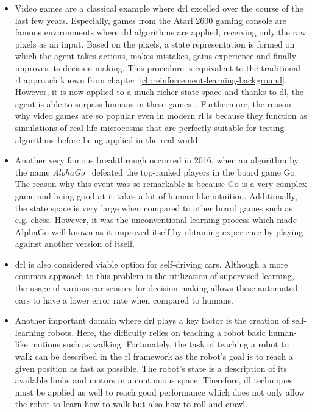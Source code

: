 \documentclass[draft,final]{vutinfth} %
\begin{document}
    \begin{itemize}
        \item Video games are a classical example where \gls{drl} excelled over the course of the last few years.
        Especially, games from the Atari 2600 gaming console are famous environments where \gls{drl} algorithms are applied, receiving only the raw pixels as an input.
        Based on the pixels, a state representation is formed on which the agent takes actions, makes mistakes, gains experience and finally improves its decision making.
        This procedure is equivalent to the traditional \gls{rl} approach known from chapter~\ref{ch:reinforcement-learning-background}.
        However, it is now applied to a much richer state-space and thanks to \gls{dl}, the agent is able to surpass humans in these games~\citep{mnih_playing_2013,schulman_trust_2015}.
        Furthermore, the reason why video games are so popular even in modern \gls{rl} is because they function as simulations of real life microcosms that are perfectly suitable for testing algorithms before being applied in the real world.

        \item   Another very famous breakthrough occurred in 2016, when an algorithm by the name \textit{AlphaGo}~\citep{silver_mastering_2017} defeated the top-ranked players in the board game Go.
        The reason why this event was so remarkable is because Go is a very complex game and being good at it takes a lot of human-like intuition.
        Additionally, the state space is very large when compared to other board games such as e.g. chess.
        However, it was the unconventional learning process which made AlphaGo well known as it improved itself by obtaining experience by playing against another version of itself.

        \item   \gls{drl} is also considered viable option for self-driving cars.
        Although a more common approach to this problem is the utilization of supervised learning, the usage of various car sensors for decision making allows these automated cars to have a lower error rate when compared to humans.
        \item   Another important domain where \gls{drl} plays a key factor is the creation of self-learning robots.
        Here, the difficulty relies on teaching a robot basic human-like motions such as walking.
        Fortunately, the task of teaching a robot to walk can be described in the \gls{rl} framework as the robot's goal is to reach a given position as fast as possible.
        The robot's state is a description of its available limbs and motors in a continuous space.
        Therefore, \gls{dl} techniques must be applied as well to reach good performance which does not only allow the robot to learn how to walk but also how to roll and crawl.
    \end{itemize}
\end{document}

